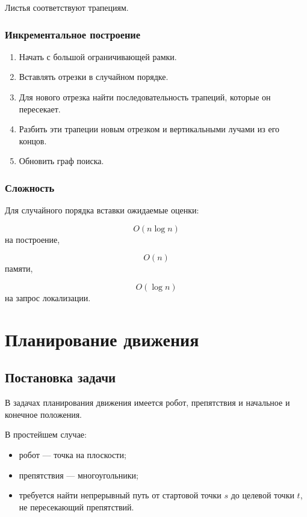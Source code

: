 \documentclass[12pt,a4paper]{article}
\begin{document}
Листья соответствуют трапециям.

\subsubsection{Инкрементальное построение}

\begin{enumerate}
    \item Начать с большой ограничивающей рамки.
    \item Вставлять отрезки в случайном порядке.
    \item Для нового отрезка найти последовательность трапеций, которые он пересекает.
    \item Разбить эти трапеции новым отрезком и вертикальными лучами из его концов.
    \item Обновить граф поиска.
\end{enumerate}

\subsubsection{Сложность}

Для случайного порядка вставки ожидаемые оценки:

\[
O(n\log n)
\]
на построение,

\[
O(n)
\]
памяти,

\[
O(\log n)
\]
на запрос локализации.

\section{Планирование движения}

\subsection{Постановка задачи}

В задачах планирования движения имеется робот, препятствия и начальное и конечное положения.

В простейшем случае:

\begin{itemize}
    \item робот — точка на плоскости;
    \item препятствия — многоугольники;
    \item требуется найти непрерывный путь от стартовой точки \(s\) до целевой точки \(t\), не пересекающий препятствий.
\end{itemize}
\end{document}
